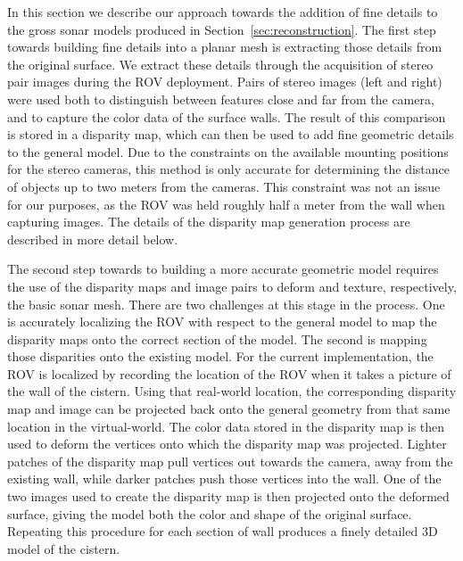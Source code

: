 \documentclass[twocolumn]{article}
\begin{document}
In this section we describe our approach towards the addition of fine details to the gross sonar models produced in Section~\ref{sec:reconstruction}.
The first step towards building fine details into a planar mesh is extracting those details from the original surface. 
We extract these details through the acquisition of stereo pair images during the ROV deployment.
Pairs of stereo images (left and right) were used both to distinguish between features close and far from the camera, and to capture the color data of the surface walls.
The result of this comparison is stored in a disparity map, which can then be used to add fine geometric details to the general model.  
Due to the constraints on the available mounting positions for the stereo cameras, this method is only accurate for determining the distance of objects up to two meters from the cameras. This constraint was not an issue for our purposes, as the ROV was held roughly half a meter from the wall when capturing images.
The details of the disparity map generation process are described in more detail below.

The second step towards to building a more accurate geometric model requires the use of the disparity maps and image pairs to deform and texture, respectively, the basic sonar mesh. There are two challenges at this stage in the process.  One is accurately localizing the ROV with respect to the general model to map the disparity maps onto the correct section of the model. The second is mapping those disparities onto the existing model.
For the current implementation, the ROV is localized by recording the location of the ROV when it takes a picture of the wall of the cistern.  
Using that real-world location, the corresponding disparity map and image can be projected back onto the general geometry from that same location in the virtual-world.
The color data stored in the disparity map is then used to deform the vertices onto which the disparity map was projected.
Lighter patches of the disparity map pull vertices out towards the camera, away from the existing wall, while darker patches push those vertices into the wall.
One of the two images used to create the disparity map is then projected onto the deformed surface, giving the model both the color and shape of the original surface. Repeating this procedure for each section of wall produces a finely detailed 3D model of the cistern.
\end{document}
